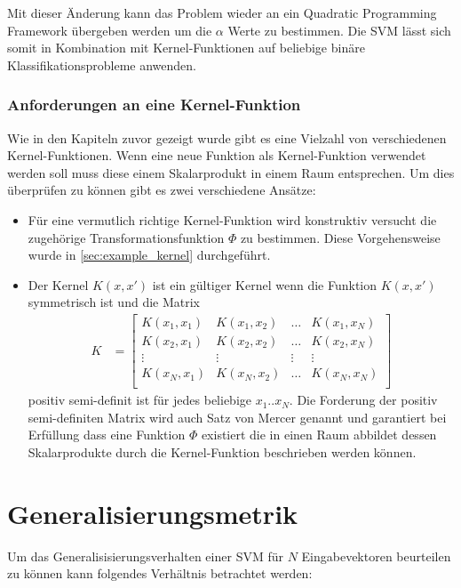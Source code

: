 \documentclass[a4paper,11pt,twoside]{scrreprt}
\begin{document}
Mit dieser Änderung kann das Problem wieder an ein Quadratic Programming Framework übergeben werden um die $\alpha$ Werte zu bestimmen. Die \ac{SVM} lässt sich somit in Kombination mit Kernel-Funktionen auf beliebige binäre Klassifikationsprobleme anwenden. 


\subsection{Anforderungen an eine Kernel-Funktion} \label{sec:kernel_conditions}
Wie in den Kapiteln zuvor gezeigt wurde gibt es eine Vielzahl von verschiedenen Kernel-Funktionen. Wenn eine neue Funktion als Kernel-Funktion verwendet werden soll muss diese einem Skalarprodukt in einem Raum entsprechen. Um dies überprüfen zu können gibt es zwei verschiedene Ansätze:

\begin{itemize}
	\item Für eine vermutlich richtige Kernel-Funktion wird konstruktiv versucht die zugehörige Transformationsfunktion $\Phi$ zu bestimmen. Diese Vorgehensweise wurde in \autoref{sec:example_kernel} durchgeführt.
	
	\item Der Kernel $K(x, x')$ ist ein gültiger Kernel wenn die Funktion $K(x, x')$ symmetrisch ist und die Matrix \[ 	
	\begin{aligned}
		K &= 
		\begin{bmatrix} 
			K(x_{1}, x_{1}) & K(x_{1}, x_{2}) & \dots & K(x_{1}, x_{N})\\
			K(x_{2}, x_{1}) & K(x_{2}, x_{2}) & \dots & K(x_{2}, x_{N})\\
			\vdots & \vdots & \vdots & \vdots\\
			K(x_{N}, x_{1}) & K(x_{N}, x_{2}) & \dots & K(x_{N}, x_{N})\\ 
		\end{bmatrix}
	\end{aligned}
\] positiv semi-definit ist für jedes beliebige $x_1..x_N$. Die Forderung der positiv semi-definiten Matrix wird auch Satz von Mercer genannt und garantiert bei Erfüllung dass eine Funktion $\Phi$ existiert die in einen Raum abbildet dessen Skalarprodukte durch die Kernel-Funktion beschrieben werden können. 
\end{itemize}


\chapter{Generalisierungsmetrik}
Um das Generalisisierungsverhalten einer \ac{SVM} für $N$ Eingabevektoren beurteilen zu können kann folgendes Verhältnis betrachtet werden:
\end{document}
